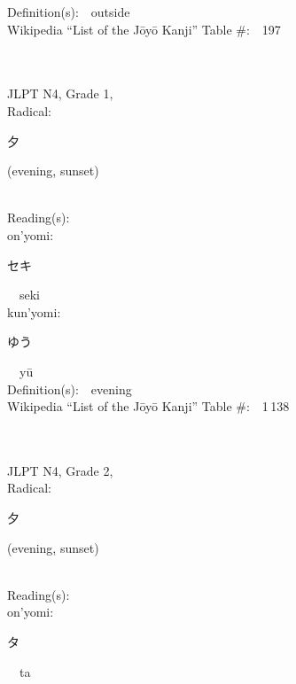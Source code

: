 \begin{multicols}{2}
Definition(s):\ \ outside \\
Wikipedia ``List of the J\=oy\=o Kanji'' Table \#:\ \ 197 \\
\ \ \\
{\fontsize{34pt}{40pt}  }\ \ \\  %
{JLPT N4, Grade 1, \\Radical:\ \ {\begin{CJK}{UTF8}{min} 夕 \end{CJK}} (evening, sunset) } \\
Reading(s):\ \ \\
{\hspace*{1em}}on'yomi:\ \ \\
{\hspace*{2em}}{\begin{CJK}{UTF8}{min} セキ \end{CJK}}\ \ seki\ \ \\
{\hspace*{1em}}kun'yomi:\ \ \\
{\hspace*{2em}}{\begin{CJK}{UTF8}{min} ゆう \end{CJK}}\ \ y\=u\ \ \\
Definition(s):\ \ evening \\
Wikipedia ``List of the J\=oy\=o Kanji'' Table \#:\ \ 1\,138 \\
\ \ \\
{\fontsize{34pt}{40pt}  }\ \ \\  %
{JLPT N4, Grade 2, \\Radical:\ \ {\begin{CJK}{UTF8}{min} 夕 \end{CJK}} (evening, sunset) } \\
Reading(s):\ \ \\
{\hspace*{1em}}on'yomi:\ \ \\
{\hspace*{2em}}{\begin{CJK}{UTF8}{min} タ \end{CJK}}\ \ ta\ \ \\

\end{multicols}
